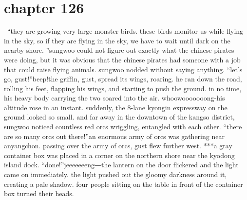 \section{chapter 126}






 “they are growing very large monster birds.
 these birds monitor us while flying in the sky, so if they are flying in the sky, we have to wait until dark on the nearby shore.
”sungwoo could not figure out exactly what the chinese pirates were doing, but it was obvious that the chinese pirates had someone with a job that could raise flying animals.
sungwoo nodded without saying anything.
“let’s go, gust!”beep!the griffin, gust, spread its wings, roaring.
 he ran down the road, rolling his feet, flapping his wings, and starting to push the ground.
 in no time, his heavy body carrying the two soared into the air.
whoowooooooong-his altitude rose in an instant.
 suddenly, the 8-lane kyongin expressway on the ground looked so small.
and far away in the downtown of the kangso district, sungwoo noticed countless red orcs wriggling, entangled with each other.
“there are so many orcs out there!”an enormous army of orcs was gathering near anyangchon.
 passing over the army of orcs, gust flew further west.
***a gray container box was placed in a corner on the northern shore near the kyodong island dock.
“done!”jeeeeeeeng―the lantern on the door flickered and the light came on immediately.
 the light pushed out the gloomy darkness around it, creating a pale shadow.
four people sitting on the table in front of the container box turned their heads.

